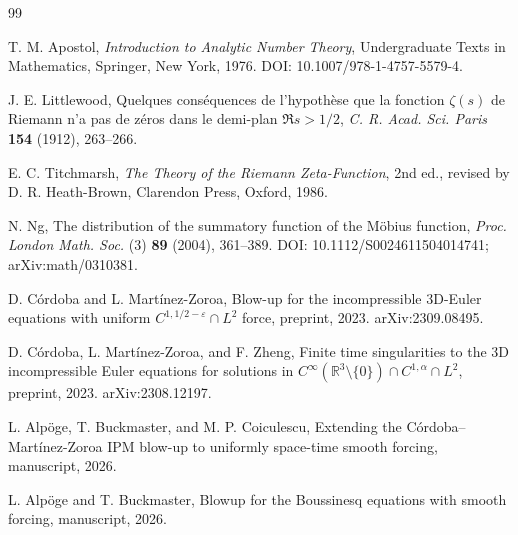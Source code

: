 \documentclass[11pt]{amsart}
\numberwithin{equation}{section}
\theoremstyle{plain}
\theoremstyle{definition}
\theoremstyle{remark}
\begin{document}
\begin{thebibliography}{99}

T. M. Apostol,
\emph{Introduction to Analytic Number Theory},
Undergraduate Texts in Mathematics, Springer, New York, 1976.
DOI: 10.1007/978-1-4757-5579-4.

J. E. Littlewood,
Quelques cons\'equences de l'hypoth\`ese que la fonction $\zeta(s)$ de
Riemann n'a pas de z\'eros dans le demi-plan $\Re s>1/2$,
\emph{C. R. Acad. Sci. Paris} \textbf{154} (1912), 263--266.

E. C. Titchmarsh,
\emph{The Theory of the Riemann Zeta-Function},
2nd ed., revised by D. R. Heath-Brown, Clarendon Press, Oxford, 1986.

N. Ng,
The distribution of the summatory function of the M\"obius function,
\emph{Proc. London Math. Soc.} (3) \textbf{89} (2004), 361--389.
DOI: 10.1112/S0024611504014741; arXiv:math/0310381.

D. C\'ordoba and L. Mart\'inez-Zoroa,
Blow-up for the incompressible 3D-Euler equations with uniform
$C^{1,1/2-\varepsilon}\cap L^2$ force,
preprint, 2023.
arXiv:2309.08495.

D. C\'ordoba, L. Mart\'inez-Zoroa, and F. Zheng,
Finite time singularities to the 3D incompressible Euler equations for
solutions in $C^\infty(\mathbb R^3\setminus\{0\})\cap C^{1,\alpha}\cap L^2$,
preprint, 2023.
arXiv:2308.12197.

L. Alp\"oge, T. Buckmaster, and M. P. Coiculescu,
Extending the C\'ordoba--Mart\'inez-Zoroa IPM blow-up to uniformly space-time
smooth forcing,
manuscript, 2026.

L. Alp\"oge and T. Buckmaster,
Blowup for the Boussinesq equations with smooth forcing,
manuscript, 2026.

\end{thebibliography}
\end{document}
